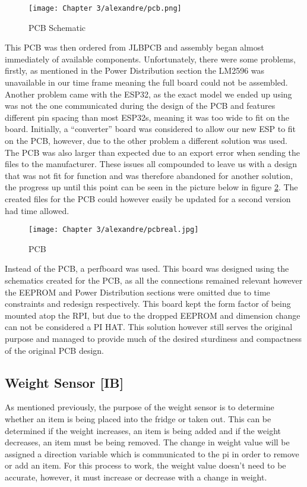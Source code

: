 \begin{figure}[H]        
    \centering
    \texttt{[image: Chapter 3/alexandre/pcb.png]}
    \caption{PCB Schematic}
    \label{fig:pcbs}
\end{figure} 

This PCB was then ordered from JLBPCB and assembly began almost immediately of available components.
Unfortunately, there were some problems, firstly, as mentioned in the Power Distribution section the LM2596 was unavailable in our time frame meaning the full board could not be assembled.
Another problem came with the ESP32, as the exact model we ended up using was not the one communicated during the design of the PCB and features different pin spacing than most ESP32s, meaning it was too wide to fit on the board.
Initially, a “converter” board was considered to allow our new ESP to fit on the PCB, however, due to the other problem a different solution was used.
The PCB was also larger than expected due to an export error when sending the files to the manufacturer.
These issues all compounded to leave us with a design that was not fit for function and was therefore abandoned for another solution, the progress up until this point can be seen in the picture below in figure \ref{fig:realpcb}.
The created files for the PCB could however easily be updated for a second version had time allowed.

\begin{figure}[H]        
    \centering
    \texttt{[image: Chapter 3/alexandre/pcbreal.jpg]}
    \caption{PCB}
    \label{fig:realpcb}
\end{figure} 

Instead of the PCB, a perfboard was used.
This board was designed using the schematics created for the PCB, as all the connections remained relevant however the EEPROM and Power Distribution sections were omitted due to time constraints and redesign respectively.
This board kept the form factor of being mounted atop the RPI, but due to the dropped EEPROM and dimension change can not be considered a PI HAT.
This solution however still serves the original purpose and managed to provide much of the desired sturdiness and compactness of the original PCB design.


\subsection{Weight Sensor [IB]}

As mentioned previously, the purpose of the weight sensor is to determine whether an item is being placed into the fridge or taken out.
This can be determined if the weight increases, an item is being added and if the weight decreases, an item must be being removed.
The change in weight value will be assigned a direction variable which is communicated to the pi in order to remove or add an item.
For this process to work, the weight value doesn't need to be accurate, however, it must increase or decrease with a change in weight.


